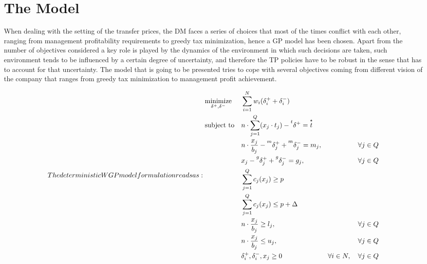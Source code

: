 \documentclass[conference,final,a4paper]{IEEEtran}
\begin{document}
\hypertarget{the-model}{%
\section{The Model}\label{the-model}}
When dealing with the setting of the transfer prices, the DM faces a series of choices that most of the times conflict with each other, ranging from management profitability requirements to greedy tax minimization, hence a GP model has been chosen. Apart from the number of objectives considered a key role is played by the dynamics of the environment in which such decisions are taken, such environment tends to be influenced by a certain degree of uncertainty, and therefore the TP policies have to be robust in the sense that has to account for that uncertainty. The model that is going to be presented tries to cope with several
objectives coming from different vision of the company that ranges from
greedy tax minimization to management profit achievement.

\begin{subequations}
The deterministic WGP model formulation reads as:
\begin{align}
    & \underset{\delta^+,\delta^-}{\text{minimize}} & & \sum^{N}_{i=1}w_i(\delta^+_i + \delta^-_i) & \label{dm_obj} \\
    & \text{subject to} & & n\cdot \sum^{Q}_{j=1}(x_j\cdot t_j) - \prescript{t}{}{\delta^+}  =\overset{\star}{t} & \label{dm_tax} \\
    & & & n\cdot \frac{x_j}{b_j} - \prescript{m}{}{\delta^+_j} + \prescript{m}{}{\delta^-_j} = m_j, & \forall j \in Q \label{dm_median} \\
    & & & {x_j} - \prescript{g}{}{\delta^+_j} + \prescript{g}{}{\delta^-_j} = g_j, & \forall j \in Q \label{dm_management} \\
    & & & \sum^{Q}_{j=1} c_j(x_j) \geq p & \label{p_l} \\ 
    & & & \sum^{Q}_{j=1} c_j(x_j) \leq p + \Delta & \label{p_u} \\
    & & & n\cdot \frac{x_j}{b_j} \geq l_j, & \forall j \in Q \label{l_q} \\
    & & & n\cdot \frac{x_j}{b_j} \leq u_j, & \forall j \in Q \label{up_q}\\
    & & & \delta^+_i,\delta^-_i,x_j\geq 0  & \forall i \in N, \quad \forall j \in Q
\end{align}
\end{subequations}
\end{document}
